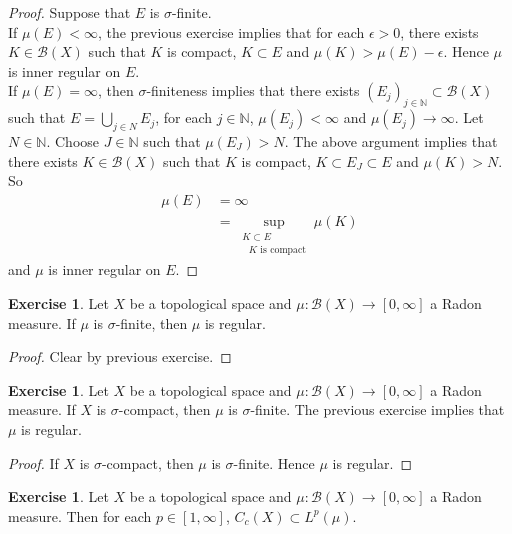 \documentclass[12pt]{amsart}
\theoremstyle{definition}
\newtheorem{ex}[definition]{Exercise}
\newcommand{\ep}{\epsilon}
\newcommand{\sig}{\sigma}
\newcommand{\N}{\mathbb{N}}
\newcommand{\MB}{\mathcal{B}}
\newcommand{\RG}{[0,\infty]}
\newcommand{\lex}[1]{\label{ex:#1}}
\begin{document}
	\begin{proof}
	Suppose that $E$ is $\sig$-finite. \\
	If $\mu(E) < \infty$, the previous exercise implies that for each $\ep > 0 $, there exists $K \in \MB(X)$ such that $K$ is compact, $K \subset E$ and $\mu(K) > \mu(E) - \ep$. Hence $\mu$ is inner regular on $E$. \\
	If $\mu(E) = \infty$, then $\sig$-finiteness implies that there exists $(E_j)_{j \in \N} \subset \MB(X)$ such that $E = \bigcup\limits_{j \in N} E_j$, for each $j \in \N$, $\mu(E_j) < \infty$ and $\mu(E_j) \rightarrow \infty$. Let $N \in \N$. Choose $J \in \N$ such that $\mu(E_J) > N$. The above argument implies that there exists $K \in \MB(X)$ such that $K$ is compact, $K \subset E_J \subset E$ and $\mu(K) > N$. So 
	\begin{align*}
	\mu(E)
	&= \infty \\
	&= \sup_{\substack{ K \subset E \\ \text{ $K$ is compact}}} \mu(K)
	\end{align*}	 
and $\mu$ is inner regular on $E$.  
	\end{proof}		
	
	\begin{ex} \lex{00000} 
	Let $X$ be a topological space and $\mu: \MB(X) \rightarrow \RG$ a Radon measure. If $\mu$ is $\sig$-finite, then $\mu$ is regular.
	\end{ex}
	
	\begin{proof}
	Clear by previous exercise.
	\end{proof}
	
	\begin{ex} \lex{00000} 
	Let $X$ be a topological space and $\mu: \MB(X) \rightarrow \RG$ a Radon measure. If $X$ is $\sig$-compact, then $\mu$ is $\sig$-finite. The previous exercise implies that $\mu$ is regular. 
	\end{ex}
	
	\begin{proof}
	If $X$ is $\sig$-compact, then $\mu$ is $\sig$-finite. Hence $\mu$ is regular.
	\end{proof}
	
		
	
	\begin{ex} \lex{00000} 
	Let $X$ be a topological space and $\mu:\MB(X) \rightarrow \RG$ a Radon measure. Then for each $p \in [1, \infty]$, $C_c(X) \subset L^p(\mu)$.
	\end{ex}
	
\end{document}
